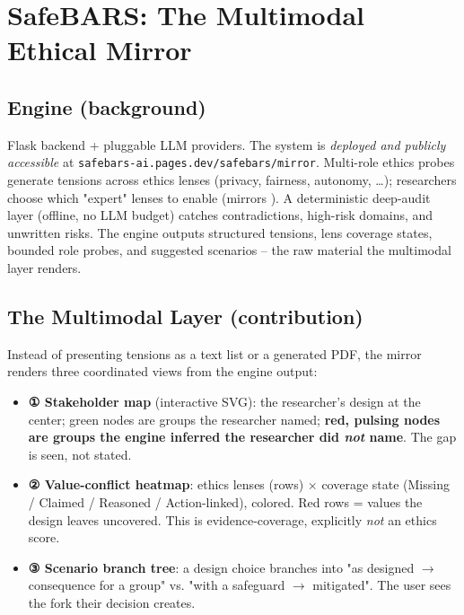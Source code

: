 \documentclass[manuscript,screen]{acmart}
\begin{document}
\section{SafeBARS: The Multimodal Ethical Mirror}
\subsection{Engine (background)}
Flask backend + pluggable LLM providers. The system is \emph{deployed and publicly
accessible} at \texttt{safebars-ai.pages.dev/safebars/mirror}. Multi-role ethics probes generate tensions
across ethics lenses (privacy, fairness, autonomy, \dots); researchers choose which
"expert" lenses to enable (mirrors \citep{perspectra26}). A deterministic deep-audit
layer (offline, no LLM budget) catches contradictions, high-risk domains, and
unwritten risks. The engine outputs structured tensions, lens coverage states, bounded
role probes, and suggested scenarios -- the raw material the multimodal layer renders.

\subsection{The Multimodal Layer (contribution)}
Instead of presenting tensions as a text list or a generated PDF, the mirror renders
three coordinated views from the engine output:
\begin{itemize}
  \item \textbf{① Stakeholder map} (interactive SVG): the researcher's design at the
    center; green nodes are groups the researcher named; \textbf{red, pulsing nodes are
    groups the engine inferred the researcher did \emph{not} name}. The gap is seen,
    not stated.
  \item \textbf{② Value-conflict heatmap}: ethics lenses (rows) $\times$ coverage state
    (Missing / Claimed / Reasoned / Action-linked), colored. Red rows = values the
    design leaves uncovered. This is evidence-coverage, explicitly \emph{not} an ethics
    score.
  \item \textbf{③ Scenario branch tree}: a design choice branches into "as designed
    $\to$ consequence for a group" vs. "with a safeguard $\to$ mitigated". The user
    sees the fork their decision creates.
\end{itemize}
\end{document}
